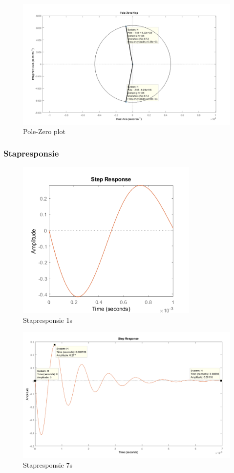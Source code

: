 \documentclass[]{article}
\begin{document}
\begin{figure}[H]
\centering
\includegraphics[width=13cm]{pz}
\caption{Pole-Zero plot}
\label{fig:pz}
\end{figure}

\subsubsection*{Stapresponsie}


\begin{figure}[H]
\centering
\includegraphics[width=9cm]{stap_1s}
\caption{Stapresponsie 1s}
\label{fig:pz}
\end{figure}

\begin{figure}[H]
\centering
\includegraphics[width=13cm]{stap_7s}
\caption{Stapresponsie 7s}
\label{fig:pz}
\end{figure}
\end{document}
